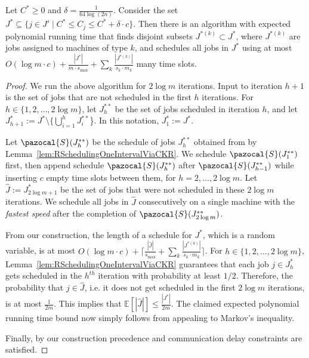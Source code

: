   \begin{lemma} \label{lem: FullSchedulingOneIntervalViaCKRForRelated}
    Let $C^* \geq 0$ and $\delta = \frac{1}{64\log(2n)}$. 
  Consider the set $J^* \subseteq \{ j \in J' \mid C^* \leq C_j \leq C^*+\delta \cdot c\}$.
    Then there is an algorithm with expected polynomial running time that finds disjoint subsets  $J^{*(k)} \subset J^*$, 
    where $J^{*(k)}$ are jobs assigned to machines of type $k$, 
    and schedules all jobs in $J^*$ using at most $O(\log m \cdot c ) + \frac{|J^*|}{m\cdot s_{\max}}+\sum_k \frac{|J^{*(k)}|}{s_k \cdot m_k}$ many time slots.
  \end{lemma}
  
  \begin{proof}
  We run the above algorithm for $2 \log m$ iterations. Input to iteration $h+1$ is the set of jobs that are not scheduled in the first $h$ iterations. 
  For $h \in \{1,2,\ldots, 2 \log m \}$, let $J^{**}_{h}$ be the set of jobs scheduled in iteration $h$, and let $J^*_{h+1} := J^* \setminus \{ \bigcup^{h}_{i = 1} J^{**}_i$\}.
   In this notation,  $J^*_1 := J^*$.
  
   Let $\pazocal{S}(J^{**}_{h})$ be the schedule of jobs $J^{**}_{h}$ obtained from by Lemma~\ref{lem:RSchedulingOneIntervalViaCKR}.
    We schedule $\pazocal{S}(J^{**}_1)$ first, then append schedule $\pazocal{S}(J^{**}_{h})$ after $\pazocal{S}(J^{**}_{h-1})$ while inserting $c$ empty time slots between them, for $h = 2,\ldots, 2 \log m$.
   Let $\hat{J} := J^{*}_{2\log m +1}$ be the set of jobs that were not scheduled in these $2\log m$ iterations.
   We schedule all jobs in $\hat{J}$ consecutively on a single machine with the {\em fastest speed} after the completion of $\pazocal{S}(J^{**}_{2 \log m})$.
   
   From our construction, the length of a schedule for  $J^*$, which is a random variable, is at most $O(\log m \cdot c) +  \lceil \frac{|\hat{J}|}{s_{\max}} +\sum_k \frac{|J^{*(k)}|}{s_k \cdot m_k} \rceil$.
   For $h \in \{ 1,2, \ldots ,2\log m\}$,  Lemma~\ref{lem:RSchedulingOneIntervalViaCKR}  guarantees that each job $j \in J^*_{h}$ gets scheduled in the $h^{th}$ iteration with probability at least $1/2$.
   Therefore, the probability that $j \in \hat{J}$,  i.e. it does not get scheduled in the first $2 \log m$ iterations, is at most $\frac{1}{2m}$.
   This implies that $\mathbb{E}[|\hat{J}|] \leq \frac{|J^*|} {2m}$.
   The claimed expected polynomial running time bound now simply follows from appealing to Markov's inequality. 
  
   
   Finally, by our construction precedence and communication delay constraints are satisfied.
  \end{proof}
  
